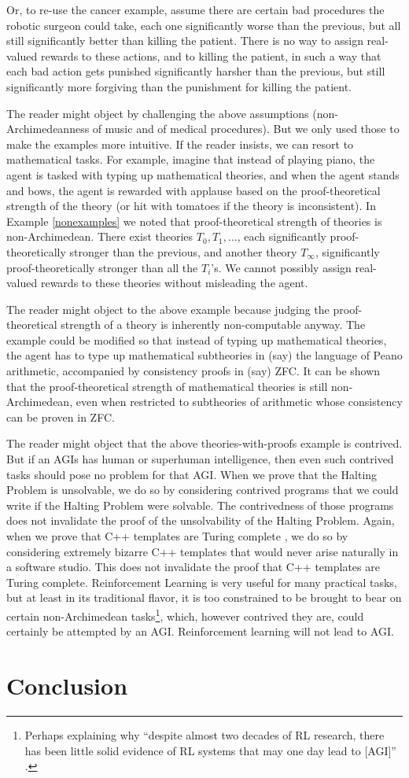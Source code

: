 \documentclass[reqno]{article}
\theoremstyle{definition}
\begin{document}
Or, to re-use the cancer example, assume there are certain bad procedures the
robotic surgeon could take, each one significantly worse than the previous,
but all still significantly better than killing the patient. There is no way
to assign real-valued rewards to these actions, and to killing the patient,
in such a way that each bad action gets punished significantly harsher than
the previous, but still significantly more forgiving than the punishment for
killing the patient.

The reader might object by challenging the above assumptions (non-Archimedeanness
of music and of medical procedures). But we only used those to make the examples
more intuitive. If the reader insists, we can resort to mathematical tasks.
For example, imagine that instead of playing piano, the agent is tasked with
typing up mathematical theories, and when the agent stands and bows, the agent
is rewarded with applause based on the proof-theoretical strength of the theory
(or hit with tomatoes if the theory is inconsistent).
In Example \ref{nonexamples} we noted that proof-theoretical strength of theories
is non-Archimedean. There exist theories $T_0,T_1,\ldots$, each significantly
proof-theoretically stronger than the previous, and another theory $T_\infty$,
significantly proof-theoretically stronger than all the $T_i$'s. We cannot
possibly assign real-valued rewards to these theories without misleading the
agent.

The reader might object to the above example because judging the proof-theoretical
strength of a theory is inherently non-computable anyway. The example could be
modified so that instead of typing up mathematical theories, the agent has to
type up mathematical subtheories in (say) the language of Peano arithmetic,
accompanied by consistency proofs in (say) ZFC. It can be shown that the
proof-theoretical strength of mathematical theories is still non-Archimedean,
even when restricted to subtheories of arithmetic whose consistency can be
proven in ZFC.

The reader might object that the above theories-with-proofs example is contrived.
But if an AGIs has human or superhuman intelligence, then even such contrived
tasks should pose no problem for that AGI. When we prove that the Halting Problem
is unsolvable, we do so by considering contrived programs that we could write if
the Halting Problem were solvable. The contrivedness of those programs does not
invalidate the proof of the unsolvability of the Halting Problem. Again, when we
prove that C++ templates are Turing complete \cite{veldhuizen}, we do so by
considering extremely
bizarre C++ templates that would never arise naturally in a software
studio. This does not invalidate the proof that C++ templates are Turing complete.
Reinforcement Learning is very useful for many practical tasks, but at least in
its traditional flavor, it is too constrained to be brought to bear on certain
non-Archimedean tasks\footnote{Perhaps explaining why
``despite almost two decades of RL research, there has been little solid
evidence of RL systems that may one day lead to [AGI]''
\cite{livingston}.}, which, however contrived they are, could certainly be
attempted by an AGI. Reinforcement learning will not lead to AGI.


\section{Conclusion}



\end{document}
